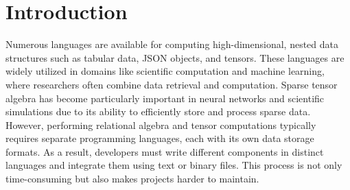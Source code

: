 \documentclass[acmsmall,nonacm]{acmart}\settopmatter{printfolios=true,printccs=false,printacmref=false}
\begin{document}

\maketitle

\section{Introduction}

Numerous languages are available for computing high-dimensional, nested data structures such as tabular data, JSON objects, and tensors. These languages are widely utilized in domains like scientific computation and machine learning, where researchers often combine data retrieval and computation. Sparse tensor algebra has become particularly important in neural networks and scientific simulations due to its ability to efficiently store and process sparse data. However, performing relational algebra and tensor computations typically requires separate programming languages, each with its own data storage formats. As a result, developers must write different components in distinct languages and integrate them using text or binary files. This process is not only time-consuming but also makes projects harder to maintain.\par
\end{document}
